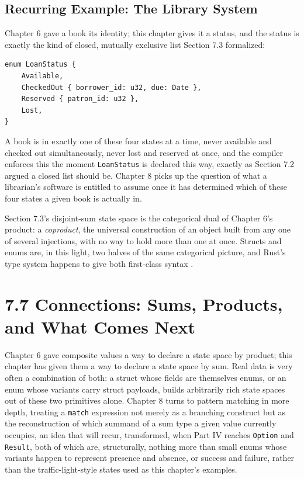 \documentclass[11pt]{book}
\begin{document}
\subsection*{Recurring Example: The Library System}

Chapter 6 gave a book its identity; this chapter gives it a status, and the status is exactly the kind of closed, mutually exclusive list Section 7.3 formalized:

\begin{lstlisting}
enum LoanStatus {
    Available,
    CheckedOut { borrower_id: u32, due: Date },
    Reserved { patron_id: u32 },
    Lost,
}
\end{lstlisting}

A book is in exactly one of these four states at a time, never available and checked out simultaneously, never lost and reserved at once, and the compiler enforces this the moment \texttt{LoanStatus} is declared this way, exactly as Section 7.2 argued a closed list should be. Chapter 8 picks up the question of what a librarian's software is entitled to assume once it has determined which of these four states a given book is actually in.

\begin{categorybox}
Section 7.3's disjoint-sum state space is the categorical dual of Chapter 6's product: a \emph{coproduct}, the universal construction of an object built from any one of several injections, with no way to hold more than one at once. Structs and enums are, in this light, two halves of the same categorical picture, and Rust's type system happens to give both first-class syntax \cite{milewski2019}.
\end{categorybox}

\section*{7.7 Connections: Sums, Products, and What Comes Next}

Chapter 6 gave composite values a way to declare a state space by product; this chapter has given them a way to declare a state space by sum. Real data is very often a combination of both: a struct whose fields are themselves enums, or an enum whose variants carry struct payloads, builds arbitrarily rich state spaces out of these two primitives alone. Chapter 8 turns to pattern matching in more depth, treating a \texttt{match} expression not merely as a branching construct but as the reconstruction of which summand of a sum type a given value currently occupies, an idea that will recur, transformed, when Part IV reaches \texttt{Option} and \texttt{Result}, both of which are, structurally, nothing more than small enums whose variants happen to represent presence and absence, or success and failure, rather than the traffic-light-style states used as this chapter's examples.
\end{document}
